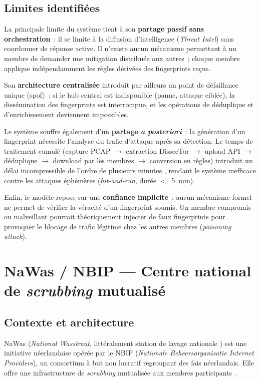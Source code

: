 \subsection{Limites identifiées}

La principale limite du système tient à son \textbf{partage passif sans orchestration}~: il se limite à la diffusion d'intelligence (\textit{Threat Intel}) sans coordonner de réponse active. Il n'existe aucun mécanisme permettant à un membre de demander une mitigation distribuée aux autres~; chaque membre applique indépendamment les règles dérivées des fingerprints reçus.

Son \textbf{architecture centralisée} introduit par ailleurs un point de défaillance unique (\gls{spof})~: si le hub central est indisponible (panne, attaque ciblée), la dissémination des fingerprints est interrompue, et les opérations de déduplique et d'enrichissement deviennent impossibles.

Le système souffre également d'un \textbf{partage \textit{a posteriori}}~: la génération d'un fingerprint nécessite l'analyse du trafic d'attaque après sa détection. Le temps de traitement cumulé (capture PCAP $\rightarrow$ extraction DissecTor $\rightarrow$ upload API $\rightarrow$ déduplique $\rightarrow$ download par les membres $\rightarrow$ conversion en règles) introduit un délai incompressible de l'ordre de plusieurs minutes \parencite{sidnlabs2021clearinghouse}, rendant le système inefficace contre les attaques éphémères (\textit{hit-and-run}, durée $<$~5~min).

Enfin, le modèle repose sur une \textbf{confiance implicite}~: aucun mécanisme formel ne permet de vérifier la véracité d'un fingerprint soumis. Un membre compromis ou malveillant pourrait théoriquement injecter de faux fingerprints pour provoquer le blocage de trafic légitime chez les autres membres (\textit{poisoning attack}).

\section{NaWas / NBIP --- Centre national de \textit{scrubbing} mutualisé}
\label{sec:nawas}

\subsection{Contexte et architecture}

NaWas (\textit{National Wasstraat}, littéralement \og station de lavage nationale \fg{}) est une initiative néerlandaise opérée par le NBIP (\textit{Nationale Beheersorganisatie Internet Providers}), un consortium à but non lucratif regroupant des \glspl{fai} néerlandais. Elle offre une infrastructure de \textit{scrubbing} mutualisée aux membres participants \parencite{nbip2023nawas}.

